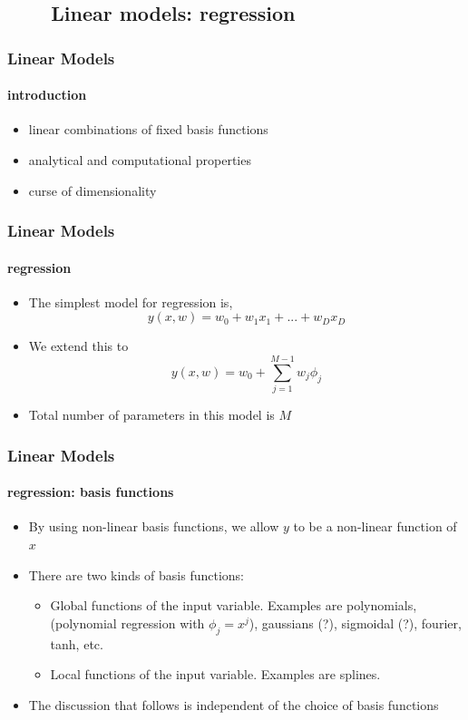 \subsection{\ \ \ \ Linear models: regression}
\begin{frame}
\frametitle{Linear Models}
\framesubtitle{introduction}
\logoCSIPCPL\mypagenum
	\begin{itemize}
		\item {\color{red}linear} combinations of {\color{red}fixed} basis functions
		\item analytical and computational properties
		\item curse of dimensionality
	\end{itemize}
\end{frame}

\begin{frame}
\frametitle{Linear Models}
\framesubtitle{regression}
\logoCSIPCPL\mypagenum
	\begin{itemize}
		\item The simplest model for regression is,	
			\begin{equation*}
			y(x,w)=w_0 + w_1x_1 + ... + w_Dx_D
			\end{equation*}	
		\item We extend this to
			\begin{equation*}
			y(x,w)=w_0 + \sum_{j=1}^{M-1}w_j\phi_j
			\end{equation*}	
		\item Total number of parameters in this model is $M$
	\end{itemize}
\end{frame}





\begin{frame}
\frametitle{Linear Models}
\framesubtitle{regression: basis functions}
\logoCSIPCPL\mypagenum
	\begin{itemize}
		\item By using non-linear basis functions, we allow $y$ to be a non-linear function of $x$
		\item There are two kinds of basis functions:	
			\begin{itemize}
				\item Global functions of the input variable.  Examples are polynomials, (polynomial regression with $\phi_j=x^j$), gaussians (?), sigmoidal (?), fourier, tanh, etc.
				\item Local functions of the input variable.  Examples are splines.
			\end{itemize}
		\item The discussion that follows is independent of the choice of basis functions
	\end{itemize}
\end{frame}



